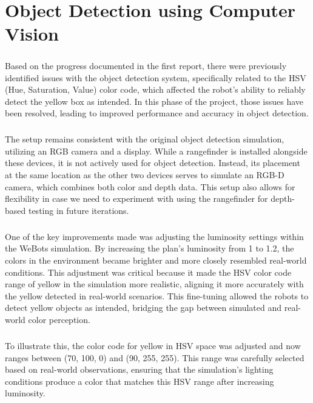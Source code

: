 \chapter{Object Detection using Computer Vision}

\paragraph*{}
Based on the progress documented in the first report, there were previously identified issues with the object detection system, specifically related to the HSV (Hue, Saturation, Value) color code, which affected the robot's ability to reliably detect the yellow box as intended. In this phase of the project, those issues have been resolved, leading to improved performance and accuracy in object detection.

\paragraph*{}
The setup remains consistent with the original object detection simulation, utilizing an RGB camera and a display. While a rangefinder is installed alongside these devices, it is not actively used for object detection. Instead, its placement at the same location as the other two devices serves to simulate an RGB-D camera, which combines both color and depth data. This setup also allows for flexibility in case we need to experiment with using the rangefinder for depth-based testing in future iterations.

\paragraph*{}
One of the key improvements made was adjusting the luminosity settings within the WeBots simulation. By increasing the plan's luminosity from 1 to 1.2, the colors in the environment became brighter and more closely resembled real-world conditions. This adjustment was critical because it made the HSV color code range of yellow in the simulation more realistic, aligning it more accurately with the yellow detected in real-world scenarios. This fine-tuning allowed the robots to detect yellow objects as intended, bridging the gap between simulated and real-world color perception.

\paragraph*{}
To illustrate this, the color code for yellow in HSV space was adjusted and now ranges between (70, 100, 0) and (90, 255, 255). This range was carefully selected based on real-world observations, ensuring that the simulation's lighting conditions produce a color that matches this HSV range after increasing luminosity.

